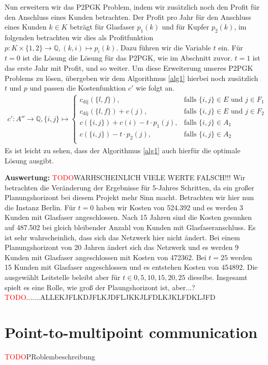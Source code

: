\documentclass[11pt,a4paper]{article}
\newcommand{\Q}{\mathbb{Q}}
\newcommand{\TODO}{\textcolor{red}{TODO}}
\theoremstyle{my_th_style1}
\begin{document}
Nun erweitern wir das P2PGK Problem, indem wir zusätzlich noch den Profit für den Anschluss eines Kunden  betrachten.
Der Profit pro Jahr für den Anschluss eines Kunden $k \in K$ beträgt für Glasfaser $p_1(k)$ und für Kupfer $p_2(k)$, im folgenden betrachten wir dies als Profitfunktion $p:K \times \{1,2\} \rightarrow \Q,(k,i) \mapsto p_i(k)$. Dazu führen wir die Variable $t$ ein. Für $t=0$ ist die Lösung die Lösung für das P2PGK, wie im Abschnitt zuvor. $t=1$ ist das erste Jahr mit Profit, und so weiter. Um diese Erweiterung unseres P2PGK Problems zu lösen, übergeben wir dem Algorithmus  \ref{alg1} hierbei noch zusätzlich $t$ und $p$ und passen die Kostenfunktion $c'$ wie folgt an.
\begin{align*}
c': A'' \rightarrow \Q, \{ i,j \} \mapsto \left\{\begin{array}{cl} 
c_{\text{dij}}(\{l,f\}), & \text{falls } \{i,j\} \in E \text{ und } j \in F_1\\ 
c_{\text{dij}}(\{l,f\})+c(j), & \text{falls } \{i,j\} \in E \text{ und } j \in F_2\\ 
c(\{i,j\}) + c(i) - t \cdot p_1(j), & \text{falls } \{i,j\} \in A_1\\ 
c(\{i,j\}) - t \cdot p_2(j), & \text{falls } \{i,j\} \in A_2\\ 
\end{array}
\right.
\end{align*}
Es ist leicht zu sehen, dass der Algorithmus \ref{alg1} auch hierfür die optimale Lösung ausgibt. 

\textbf{Auswertung:}
\TODO WARHSCHEINLICH VIELE WERTE FALSCH!!!
Wir betrachten die Veränderung der Ergebnisse für 5-Jahres Schritten, da ein großer Planungshorizont bei diesem Projekt mehr Sinn macht.
Betrachten wir hier nun die Instanz Berlin. Für $t=0$ haben wir Kosten von 524.392 und es werden 3 Kunden mit Glasfaser angeschlossen. Nach 15 Jahren sind die Kosten gesunken auf 487.502 bei gleich bleibender Anzahl von Kunden mit Glasfaseranschluss. Es ist sehr wahrscheinlich, dass sich das Netzwerk hier nicht ändert. Bei einem Planungshorizont von 20 Jahren ändert sich das Netzwerk und es werden 9 Kunden mit Glasfaser angeschlossen mit Kosten von 472362. Bei $t=25$ werden 15 Kunden mit Glasfaser angeschlossen und es entstehen Kosten von 454892. Die ausgewählt Leitstelle beleibt aber für $t \in {0,5,10,15,20,25}$ dieselbe.
Insgesamt spielt es eine Rolle, wie groß der Plaungshorizont ist, aber...?\TODO.......ALLEKJFLKDJFLKJDFLJKKJLFDLKJKLFDKLJFD

\section{Point-to-multipoint communication}
\TODO PRoblembeschreibung
 
\end{document}
